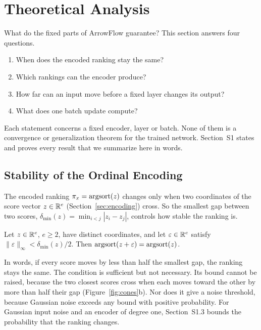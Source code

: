 \section{Theoretical Analysis}\label{sec:theory}

What do the fixed parts of ArrowFlow guarantee? This section answers four questions.
\begin{enumerate}[leftmargin=2em,topsep=2pt,itemsep=1pt]
\item When does the encoded ranking stay the same?
\item Which rankings can the encoder produce?
\item How far can an input move before a fixed layer changes its output?
\item What does one batch update compute?
\end{enumerate}
Each statement concerns a fixed encoder, layer or batch. None of them is a convergence or generalization theorem for the trained network. Section~S1 states and proves every result that we summarize here in words.

\subsection{Stability of the Ordinal Encoding}\label{sec:theory-stability}

The encoded ranking $\pi_x=\mathrm{argsort}(z)$ changes only when two coordinates of the score vector $z\in\mathbb{R}^e$ (Section~\ref{sec:encoding}) cross. So the smallest gap between two scores, $\delta_{\min}(z)=\min_{i<j}|z_i-z_j|$, controls how stable the ranking is.

\begin{proposition}\label{prop:score-stability}
Let $z\in\mathbb{R}^e$, $e\ge2$, have distinct coordinates, and let $\varepsilon\in\mathbb{R}^e$ satisfy $\|\varepsilon\|_\infty<\delta_{\min}(z)/2$. Then $\mathrm{argsort}(z+\varepsilon)=\mathrm{argsort}(z)$.
\end{proposition}

In words, if every score moves by less than half the smallest gap, the ranking stays the same. The condition is sufficient but not necessary. Its bound cannot be raised, because the two closest scores cross when each moves toward the other by more than half their gap (Figure~\ref{fig:cones}b). Nor does it give a noise threshold, because Gaussian noise exceeds any bound with positive probability. For Gaussian input noise and an encoder of degree one, Section~S1.3 bounds the probability that the ranking changes.

